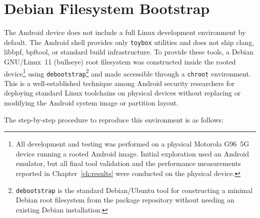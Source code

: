 \documentclass{mnitjaipur}
\begin{document}
\section{Debian Filesystem Bootstrap}
The Android device does not include a full Linux development environment by default. The Android shell provides only \texttt{toybox} utilities and does not ship clang, libbpf, bpftool, or standard build infrastructure. To provide these tools, a Debian GNU/Linux~11 (bullseye) root filesystem was constructed inside the rooted device\footnote{All development and testing was performed on a physical Motorola G96~5G device running a rooted Android image. Initial exploration used an Android emulator, but all final tool validation and the performance measurements reported in Chapter~\ref{ch:results} were conducted on the physical device.} using \texttt{debootstrap}\footnote{\texttt{debootstrap} is the standard Debian/Ubuntu tool for constructing a minimal Debian root filesystem from the package repository without needing an existing Debian installation.} and made accessible through a \texttt{chroot} environment. This is a well-established technique among Android security researchers for deploying standard Linux toolchains on physical devices without replacing or modifying the Android system image or partition layout.

The step-by-step procedure to reproduce this environment is as follows:
\end{document}
